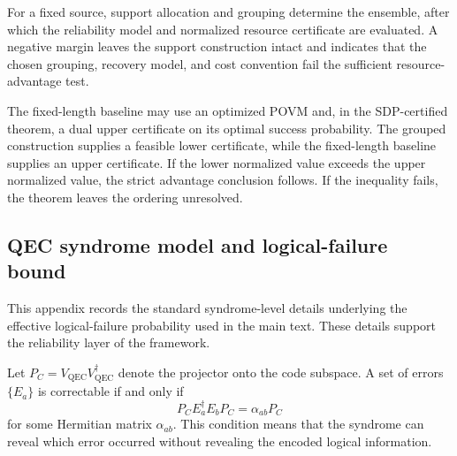 For a fixed source, support allocation and grouping determine the ensemble, after which the reliability model and normalized resource certificate are evaluated. A negative margin leaves the support construction intact and indicates that the chosen grouping, recovery model, and cost convention fail the sufficient resource-advantage test.

The fixed-length baseline may use an optimized POVM and, in the SDP-certified theorem, a dual upper certificate on its optimal success probability. The grouped construction supplies a feasible lower certificate, while the fixed-length baseline supplies an upper certificate. If the lower normalized value exceeds the upper normalized value, the strict advantage conclusion follows. If the inequality fails, the theorem leaves the ordering unresolved.


\label{app:qec_sdp_details}

\subsection*{QEC syndrome model and logical-failure bound}
\label{app:qec_syndrome}

This appendix records the standard syndrome-level details underlying the effective logical-failure probability used in the main text. These details support the reliability layer of the framework.

Let $P_C=V_{\mathrm{QEC}}V_{\mathrm{QEC}}^\dagger$ denote the projector onto the code subspace. A set of errors $\{E_a\}$ is correctable if and only if
\begin{equation}
    P_C E_a^\dagger E_b P_C
    =
    \alpha_{ab}P_C
\end{equation}
for some Hermitian matrix $\alpha_{ab}$. This condition means that the syndrome can reveal which error occurred without revealing the encoded logical information.

